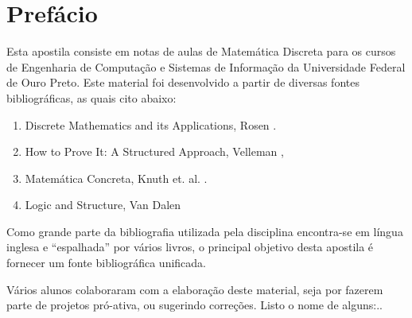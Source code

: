 \chapter*{Prefácio}

Esta apostila consiste em notas de aulas de Matemática Discreta para
os cursos de Engenharia de Computação e Sistemas de Informação da
Universidade Federal de Ouro Preto. Este material foi desenvolvido a
partir de diversas fontes bibliográficas, as quais cito abaixo:
\begin{enumerate}
  \item Discrete Mathematics and its Applications, Rosen \cite{Rosen02}.
  \item How to Prove It: A Structured Approach, Velleman
    \cite{Velleman06},
  \item Matemática Concreta, Knuth et. al. \cite{Graham94}.
  \item Logic and Structure, Van Dalen \cite{Dalen94}
\end{enumerate}

Como grande parte da bibliografia utilizada pela disciplina
encontra-se em língua inglesa e ``espalhada'' por vários livros,
o principal objetivo desta apostila é fornecer um fonte bibliográfica
unificada.

Vários alunos colaboraram com a elaboração deste material, seja por
fazerem parte de projetos pró-ativa, ou sugerindo correções. Listo o
nome de alguns:..
